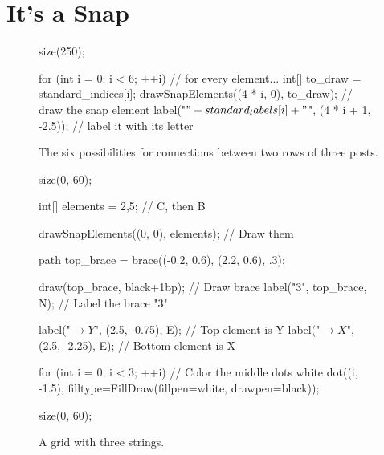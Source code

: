 \documentclass[../gatm.tex]{subfiles}
\begin{document}
\section{It's a Snap}

\newcommand\snap{\bullet} %

\begin{figure}[h]
	\centering
	\begin{center}
		\begin{asy}[width=\textwidth]
			size(250);

			for (int i = 0; i < 6; ++i) { // for every element...
				int[] to_draw = {standard_indices[i]};
				drawSnapElements((4 * i, 0), to_draw); // draw the snap element
				label("$" + standard_labels[i] + "$", (4 * i + 1, -2.5)); // label it with its letter
			}
		\end{asy}
		
		\caption{The six possibilities for connections between two rows of three posts.}
		\label{fig:all_3_cols}
	\end{center}
	\begin{minipage}{.45\textwidth}\centering
		\begin{center}
			\begin{asy}[width=\textwidth]
				size(0, 60);

				int[] elements = {2,5}; // C, then B

				drawSnapElements((0, 0), elements); // Draw them

				path top_brace = brace((-0.2, 0.6), (2.2, 0.6), .3);

				draw(top_brace, black+1bp); // Draw brace
				label("$3$", top_brace, N); // Label the brace "3"

				label("$\rightarrow Y$", (2.5, -0.75), E); // Top element is Y
				label("$\rightarrow X$", (2.5, -2.25), E); // Bottom element is X

				for (int i = 0; i < 3; ++i) // Color the middle dots white
					dot((i, -1.5), filltype=FillDraw(fillpen=white, drawpen=black));
			\end{asy}

			\caption{A grid with three strings.}
			\label{fig:n_rows_3_cols_ex}
		\end{center}
	\end{minipage}\hfill
	\begin{minipage}{.45\textwidth}\centering
		\begin{center}
			\begin{asy}[width=\textwidth]
				size(0, 60);


\end{asy}
\end{center}
\end{minipage}
\end{figure}
\end{document}
